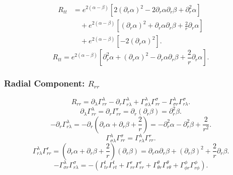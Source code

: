 \documentclass[11pt, a4paper]{report}
\begin{document}
\begin{align}
R_{tt} &= e^{2(\alpha-\beta)} \left[ 2(\partial_r\alpha)^2 - 2\partial_r\alpha\partial_r\beta + \partial_r^2\alpha \right] \nonumber \\
&\quad + e^{2(\alpha-\beta)} \left[ (\partial_r\alpha)^2 + \partial_r\alpha\partial_r\beta + \frac{2}{r}\partial_r\alpha \right] \nonumber \\
&\quad + e^{2(\alpha-\beta)} \left[ -2(\partial_r\alpha)^2 \right].
\end{align}
\begin{equation}
R_{tt} = e^{2(\alpha-\beta)} \left[ \partial_r^2\alpha + (\partial_r\alpha)^2 - \partial_r\alpha\partial_r\beta + \frac{2}{r}\partial_r\alpha \right].
\end{equation}

\subsubsection{Radial Component: $R_{rr}$}
\begin{equation}
R_{rr} = \partial_\lambda \Gamma^\lambda_{rr} - \partial_r \Gamma^\lambda_{r\lambda} + \Gamma^\lambda_{\sigma\lambda} \Gamma^\sigma_{rr} - \Gamma^\lambda_{\sigma r} \Gamma^\sigma_{r\lambda}.
\end{equation}
\begin{equation}
\partial_\lambda \Gamma^\lambda_{rr} = \partial_r \Gamma^r_{rr} = \partial_r (\partial_r\beta) = \partial_r^2\beta.
\end{equation}
\begin{equation}
-\partial_r \Gamma^\lambda_{r\lambda} = -\partial_r \left( \partial_r\alpha + \partial_r\beta + \frac{2}{r} \right) = -\partial_r^2\alpha - \partial_r^2\beta + \frac{2}{r^2}.
\end{equation}
\begin{equation}
\Gamma^\lambda_{\sigma\lambda} \Gamma^\sigma_{rr} = \Gamma^\lambda_{r\lambda} \Gamma^r_{rr}.
\end{equation}
\begin{equation}
\Gamma^\lambda_{r\lambda} \Gamma^r_{rr} = \left( \partial_r\alpha + \partial_r\beta + \frac{2}{r} \right) (\partial_r\beta) = \partial_r\alpha\partial_r\beta + (\partial_r\beta)^2 + \frac{2}{r}\partial_r\beta.
\end{equation}
\begin{equation}
-\Gamma^\lambda_{\sigma r} \Gamma^\sigma_{r\lambda} = -\left( \Gamma^t_{tr} \Gamma^t_{rt} + \Gamma^r_{rr} \Gamma^r_{rr} + \Gamma^\theta_{\theta r} \Gamma^\theta_{r\theta} + \Gamma^\phi_{\phi r} \Gamma^\phi_{r\phi} \right).
\end{equation}
\end{document}
